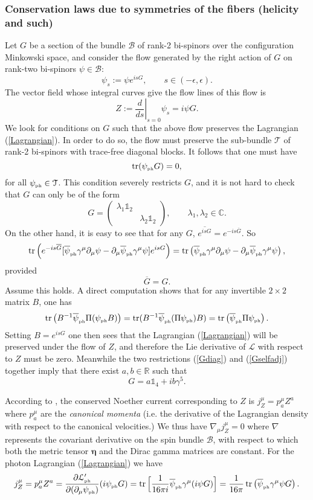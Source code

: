 \documentclass[12pt]{article}
\theoremstyle{definition}
\DeclareMathOperator{\tr}{tr}
\newcommand{\refeq}[1]{(\ref{#1})}
\numberwithin{equation}{section}
\newcommand{\beq}{\begin{equation}}
\newcommand{\eeq}{\end{equation}}
\newcommand{\Id}{\mathds{1}}
\newcommand{\p}{\partial}
\newcommand{\cB}{\mathcal{B}}
\newcommand{\cL}{{\mathcal L}}
\newcommand{\cLph}{{\mathcal L}_{\mbox{\tiny{ph}}}}
\newcommand{\cT}{\mathcal{T}}
\newcommand{\psiPH}{{\psi_{\mbox{\rm\tiny ph}}}}
\newcommand{\psiPHb}{{\overline\psi_{\mbox{\rm\tiny ph}}}}
\newcommand{\Cset}{{\mathbb C}}
\newcommand{\Rset}{{\mathbb R}}
\newcommand{\la}{\lambda}
\newcommand{\ga}{\gamma}
\newcommand{\ep}{\epsilon}
\newcommand{\nab}{\nabla}
\begin{document}
\subsubsection{Conservation laws due to symmetries of the fibers (helicity and such)}
 Let $G$ be a section of the bundle $\cB$ of rank-2 bi-spinors over the configuration Minkowski space, and consider the flow generated by the right 
action 
of $G$ on rank-two bi-spinors $\psi \in \cB$:
\beq 
\psi_s := \psi e^{isG},\qquad s \in (-\ep,\ep).
\eeq
 The vector field whose integral curves give the flow lines of this flow is
\beq 
Z := \left.\frac{d}{ds}\right|_{s=0} \psi_s = i \psi G.
\eeq
We look for conditions on $G$ such that the above flow preserves the Lagrangian \refeq{Lagrangian}. 
 In order to do so, the flow must preserve the sub-bundle $\cT$ of rank-2 bi-spinors with trace-free diagonal blocks.  
It follows that one must have 
\beq  \tr (\psiPH G ) = 0,
\eeq for all $\psiPH \in \cT$.  This condition severely restricts $G$, and it is not hard to check that $G$ can only be of the form
\beq \label{Gdiag} G = \left(\begin{array}{cc} \la_1 \Id_2 & \\ & \la_2 \Id_2 \end{array}\right),\qquad \la_1,\la_2 \in \Cset.
\eeq
On the other hand, it is easy to see that for any $G$, $\overline{e^{isG}} = e^{-is\overline{G}}$. 
 So
\beq 
 \tr\left( e^{-is\overline{G}} [ \psiPHb\ga^\mu \p_\mu \psi -  \p_\mu \psiPHb \ga^\mu \psi ] e^{isG} \right) =  \tr\left( \psiPHb\ga^\mu \p_\mu \psi -  \p_\mu \psiPHb \ga^\mu \psi \right),
\eeq
provided 
\beq \label{Gselfadj}\overline{G} = G.
\eeq
 Assume this holds. 
 A direct computation shows that for any invertible $2\times 2$ matrix $B$, one has
\beq 
\tr \left( B^{-1} \psiPHb \Pi (\psiPH B)\right) = \tr (B^{-1} \psiPHb (\Pi\psiPH)B) = \tr \left(\psiPHb \Pi \psiPH\right). 
\eeq
 Setting $B = e^{isG}$ one then sees that the Lagrangian \refeq{Lagrangian} will be preserved under the flow of $Z$, and 
therefore the Lie derivative of $\cL$ with respect to $Z$ must be zero. 
 Meanwhile the two restrictions \refeq{Gdiag} and \refeq{Gselfadj} together imply that there exist $a,b\in\Rset$ such that
\beq 
G = a \Id_4 + i b \ga^5.
\eeq

 According to \cite{Chr2000}, the conserved Noether current corresponding to $Z$ is $j_Z^\mu = p^\mu_a Z^a$ where $p^\mu_a$ are 
the {\em canonical momenta} (i.e. the derivative of the Lagrangian density with respect to the canonical velocities.)
 We thus have $\nab_\mu j_Z^\mu = 0 $ where $\nab$ represents the covariant derivative on the spin bundle $\cB$, with respect to 
which both the metric tensor $\boldsymbol{\eta}$ and the Dirac gamma matrices are constant. 
 For the photon Lagrangian \refeq{Lagrangian} we have
\beq \label{helicityCURRENT}
j_Z^\mu = p^\mu_a Z^a = \frac{\p \cLph'}{\p(\p_\mu \psiPH)}(i\psiPH G) =  \tr\Big[\frac{1}{16 \pi i} \psiPHb \ga^\mu (i \psi G)\Big] =
 \frac{1}{16 \pi}\tr\left(\psiPHb\ga^\mu \psi G\right).
\eeq
\end{document}
